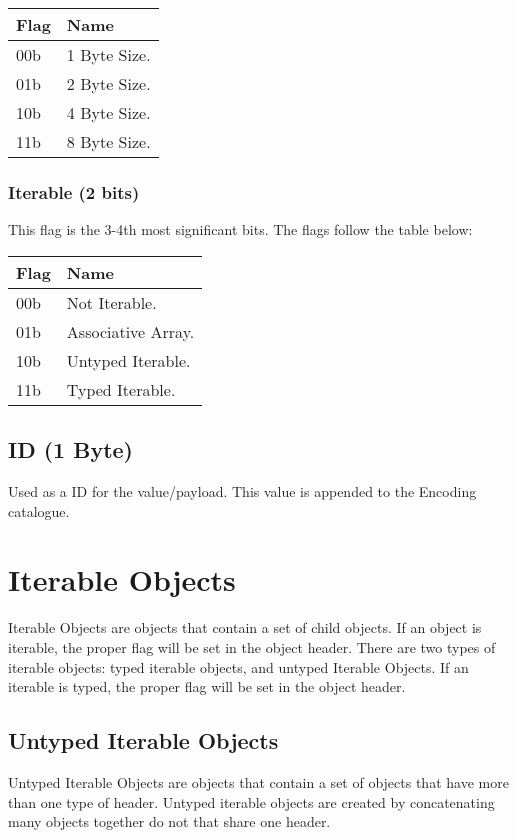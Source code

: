 \documentclass[11pt]{article}
\begin{document}
\begin{center}
	\begin{tabular}{ |l|l| }
		\hline
		\textbf{Flag} & \textbf{Name} \\
		\hline
		00b           & 1 Byte Size.  \\
		01b           & 2 Byte Size.  \\
		10b           & 4 Byte Size.  \\
		11b           & 8 Byte Size.  \\
		\hline
	\end{tabular}
\end{center}

\subsubsection{Iterable (2 bits)}
This flag is the 3-4th most significant bits. The flags follow the table below:

\begin{center}
	\begin{tabular}{ |l|l| }
		\hline
		\textbf{Flag} & \textbf{Name}      \\
		\hline
		00b           & Not Iterable.      \\
		01b           & Associative Array. \\
		10b           & Untyped Iterable.  \\
		11b           & Typed Iterable.    \\
		\hline
	\end{tabular}
\end{center}




\subsection{ID (1 Byte)}
Used as a ID for the value/payload. This value is appended to the Encoding catalogue.

\section{Iterable Objects}
Iterable Objects are objects that contain a set of child objects. If an object is iterable, the proper flag will be set in the object header. There are two types of iterable objects: typed iterable objects, and untyped Iterable Objects. If an iterable is typed, the proper flag will be set in the object header.

\subsection{Untyped Iterable Objects}
Untyped Iterable Objects are objects that contain a set of objects that have more than one type of header. Untyped iterable objects are created by concatenating many objects together do not that share one header.
\end{document}
